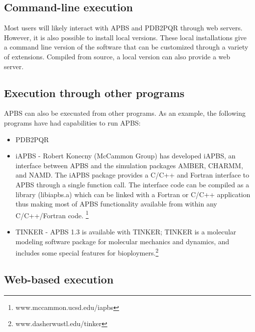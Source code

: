 \documentclass[journal=jpcbfk, manuscript=article]{achemso}
\begin{document}
\subsection{Command-line execution}
Most users will likely interact with APBS and PDB2PQR through web servers. However, it is also possible to install local versions. These local installations give a command line version of the  software that can be customized through a variety of extensions. Compiled from source, a local version can also provide a web server.

\subsection{Execution through other programs}
APBS can also be execuated from other programs. As an example, the following programs have had capabilities to run APBS:
\begin{itemize}
	\itemsep-0.25em
	\item PDB2PQR
	\item iAPBS - Robert Konecny (McCammon Group) has developed iAPBS, an interface between APBS and the simulation packages AMBER, CHARMM, and NAMD. The iAPBS package provides a C/C++ and Fortran interface to APBS through a single function call. The interface code can be compiled as a library (libiapbs.a) which can be linked with a Fortran or C/C++ application thus making most of APBS functionality available from within any C/C++/Fortran code. \footnote{www.mccammon.ucsd.edu/iapbs} 
	\item TINKER - APBS 1.3 is available with TINKER; TINKER is a molecular modeling software package for molecular mechanics and dynamics, and includes some special features for bioploymers.\footnote{www.dasherwustl.edu/tinker}
\end{itemize}

\subsection{Web-based execution}
\end{document}
